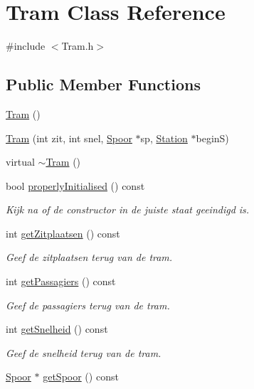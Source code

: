 \hypertarget{class_tram}{}\section{Tram Class Reference}
\label{class_tram}


{\ttfamily \#include $<$Tram.\+h$>$}

\subsection*{Public Member Functions}
\begin{DoxyCompactItemize}
\item 
\hyperlink{class_tram_aad83b2e7e79d57528691bf317ab0e1ef}{Tram} ()
\item 
\hyperlink{class_tram_a0a092211c8c234c6372318a622810d2c}{Tram} (int zit, int snel, \hyperlink{class_spoor}{Spoor} $\ast$sp, \hyperlink{class_station}{Station} $\ast$beginS)
\item 
virtual \hyperlink{class_tram_acd6056d2289f2dccd371bc226cd2cb17}{$\sim$\+Tram} ()
\item 
bool \hyperlink{class_tram_a98992eff0453f54fbe64e1f1064169c7}{properly\+Initialised} () const 
\begin{DoxyCompactList}\small\item\em Kijk na of de constructor in de juiste staat geeindigd is. \end{DoxyCompactList}\item 
int \hyperlink{class_tram_aa366e37291186d6cfd402aa7b6cfec2d}{get\+Zitplaatsen} () const 
\begin{DoxyCompactList}\small\item\em Geef de zitplaatsen terug van de tram. \end{DoxyCompactList}\item 
int \hyperlink{class_tram_a8e9e449f0032f0f439c196e0980a891e}{get\+Passagiers} () const 
\begin{DoxyCompactList}\small\item\em Geef de passagiers terug van de tram. \end{DoxyCompactList}\item 
int \hyperlink{class_tram_a40a12ae66cdc8965fc73d548dd038e4c}{get\+Snelheid} () const 
\begin{DoxyCompactList}\small\item\em Geef de snelheid terug van de tram. \end{DoxyCompactList}\item 
\hyperlink{class_spoor}{Spoor} $\ast$ \hyperlink{class_tram_adbc74e26b3924b0f6a5bfbec9fa8188c}{get\+Spoor} () const 

\end{DoxyCompactItemize}

